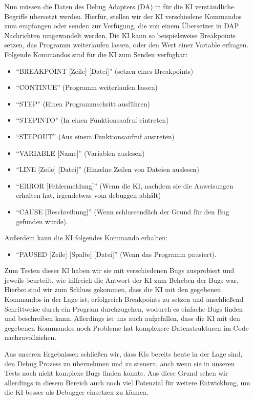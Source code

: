 \documentclass[a4paper,12pt,ngerman]{scrartcl}
\begin{document}
Nun müssen die Daten des Debug Adapters (DA) in für die KI verständliche Begriffe übersetzt werden. Hierfür, stellen wir der KI verschiedene Kommandos zum empfangen oder senden zur Verfügung, die von einem Übersetzer in DAP Nachrichten umgewandelt werden. Die KI kann so beispielsweise Breakpoints setzen, das Programm weiterlaufen lassen, oder den Wert einer Variable erfragen. Folgende Kommandos sind für die KI zum Senden verfügbar:
\begin{itemize}
	\item ``BREAKPOINT [Zeile] [Datei]'' (setzen eines Breakpoints)
	\item ``CONTINUE'' (Programm weiterlaufen lassen)
	\item ``STEP'' (Einen Programmschritt ausführen)
	\item ``STEPINTO'' (In einen Funktionsaufruf eintreten)
	\item ``STEPOUT'' (Aus einem Funktionsaufruf austreten)
	\item ``VARIABLE [Name]'' (Variablen auslesen)
	\item ``LINE [Zeile] [Datei]'' (Einzelne Zeilen von Dateien auslesen)
	\item ``ERROR [Fehlermeldung]'' (Wenn die KI, nachdem sie die Anweisungen erhalten hat, irgendetwas vom debuggen abhält)
	\item ``CAUSE [Beschreibung]'' (Wenn schlussendlich der Grund für den Bug gefunden wurde).
\end{itemize}
Außerdem kann die KI folgendes Kommando erhalten:
\begin{itemize}
	\item ``PAUSED [Zeile] [Spalte] [Datei]'' (Wenn das Programm pausiert).
\end{itemize}

Zum Testen dieser KI haben wir sie mit verschiedenen Bugs ausprobiert und jeweils beurteilt, wie hilfreich die Antwort der KI zum Beheben der Bugs war. Hierbei sind wir zum Schluss gekommen, dass die KI mit den gegebenen Kommandos in der Lage ist, erfolgreich Breakpoints zu setzen und anschließend Schrittweise durch ein Program durchzugehen, wodurch es einfache Bugs finden und beschreiben kann. Allerdings ist uns auch aufgefallen, dass die KI mit den gegebenen Kommandos noch Probleme hat komplexere Datenstrukturen im Code nachzuvollziehen.

Aus unseren Ergebnissen schließen wir, dass KIs bereits heute in der Lage sind, den Debug Prozess zu übernehmen und zu steuern, auch wenn sie in unseren Tests noch nicht komplexe Bugs finden konnte. Aus diese Grund sehen wir allerdings in diesem Bereich auch noch viel Potenzial für weitere Entwicklung, um die KI besser als Debugger einsetzen zu können.
\end{document}

